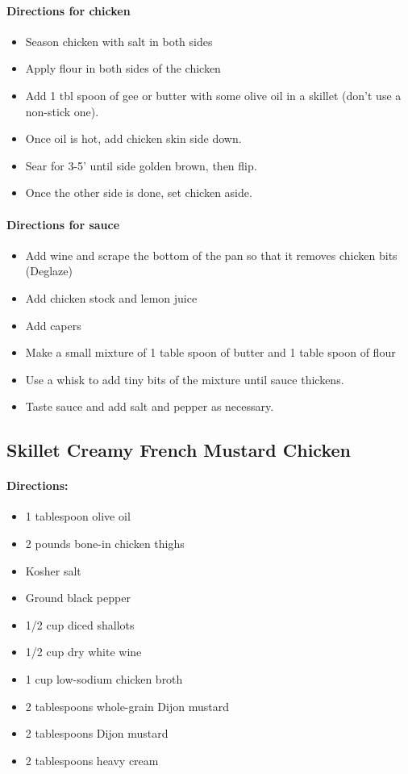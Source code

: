 \documentclass{article}
\begin{document}
\paragraph{Directions for chicken}
\begin{itemize}
	\item Season chicken with salt in both sides
	\item Apply flour in both sides of the chicken
	\item Add 1 tbl spoon of gee or butter with some olive oil in a skillet (don't use a non-stick one).
	\item Once oil is hot, add chicken skin side down.
	\item Sear for 3-5' until side golden brown, then flip.
	\item Once the other side is done, set chicken aside.
\end{itemize}

\paragraph{Directions for sauce}
\begin{itemize}
	\item Add wine and scrape the bottom of the pan so that it removes chicken bits (Deglaze)
	\item Add chicken stock and lemon juice
	\item Add capers
	\item Make a small mixture of 1 table spoon of butter and 1 table spoon of flour
	\item Use a whisk to add tiny bits of the mixture until sauce thickens.
	\item Taste sauce and add salt and pepper as necessary.
\end{itemize}

\subsection{Skillet Creamy French Mustard Chicken}

\paragraph{Directions:}
\begin{itemize}
	\item 1 tablespoon olive oil
	\item 2 pounds bone-in chicken thighs
	\item Kosher salt
	\item Ground black pepper
	\item 1/2 cup diced shallots
	\item 1/2 cup dry white wine
	\item 1 cup low-sodium chicken broth
	\item 2 tablespoons whole-grain Dijon mustard
	\item 2 tablespoons Dijon mustard
	\item 2 tablespoons heavy cream	
\end{itemize}
\end{document}
